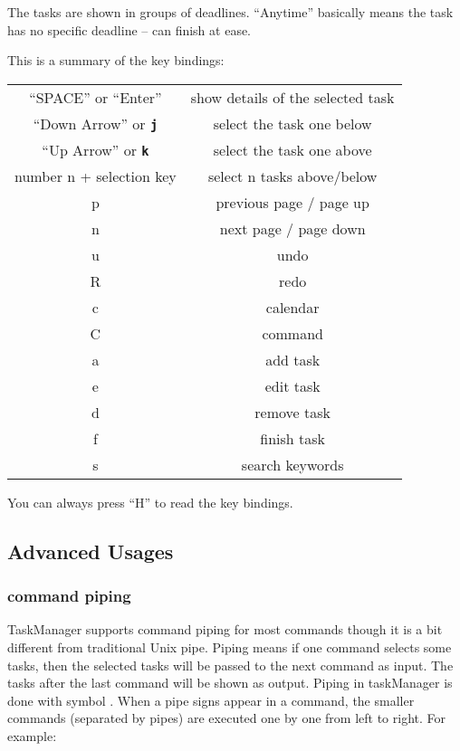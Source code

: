 \documentclass[12pt, a4paper]{article}
\newcommand{\cmd}[1]{{\bf \texttt{\begin{quote} #1 \end{quote}}}}
\newcommand{\cmdinline}[1]{{\bf \texttt{#1}}}
\begin{document}
The tasks are shown in groups of deadlines. ``Anytime'' basically means the task has no specific deadline -- can finish at ease.

This is a summary of the key bindings:\\

\begin{tabular}{c | c}
  ``SPACE'' or ``Enter'' & show details of the selected task\\
  ``Down Arrow'' or \cmdinline{j} & select the task one below\\
  ``Up Arrow'' or \cmdinline{k} & select the task one above\\
  number n + selection key & select n tasks above/below\\
  p & previous page / page up\\
  n & next page / page down\\
  u & undo\\
  R & redo\\
  c & calendar\\
  C & command\\
  a & add task\\
  e & edit task\\
  d & remove task\\
  f & finish task\\
  s & search keywords\\
\end{tabular}

You can always press ``H'' to read the key bindings.

\subsection{Advanced Usages}
\subsubsection{command piping}
\noindent \cmd{> \ ls \textbar \  rm}
TaskManager supports command piping for most commands though it is a bit different from traditional Unix pipe.
Piping means if one command selects some tasks, then the selected tasks will be passed to the next command as input. The tasks after the last command will be shown as output.
Piping in taskManager is done with symbol \cmdinline{\textbar}. When a pipe signs appear in a command, the smaller commands (separated by pipes) are executed one by one from left to right. For example:
\end{document}
